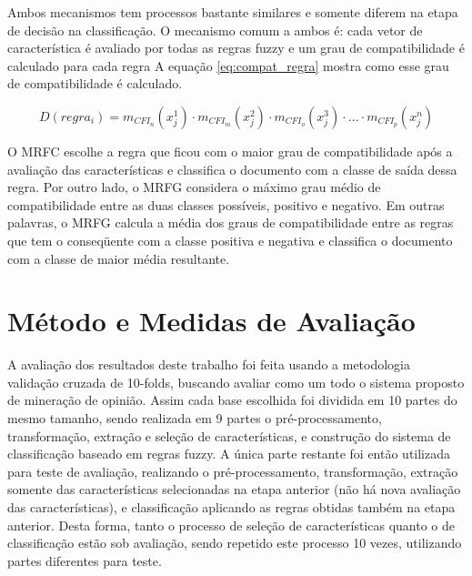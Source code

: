 \documentclass[template.tex]{subfiles}
\begin{document}

Ambos mecanismos tem processos bastante similares e somente diferem na etapa de decisão na classificação. O mecanismo comum a ambos é: cada vetor de característica é avaliado por todas as regras fuzzy e um grau de compatibilidade é calculado para cada regra A equação \ref{eq:compat_regra} mostra como esse grau de compatibilidade é calculado. 


\begin{equation}
D(regra_i) = m_{CFI_n}(x_j^1) \cdot m_{CFI_m}(x_j^2) \cdot m_{CFI_o}(x_j^3) \cdot ...\cdot m_{CFI_p}(x_j^n)
\label{eq:compat_regra}
\end{equation}

O MRFC escolhe a regra que ficou com o maior grau de compatibilidade após a avaliação das características e classifica o documento com a classe de saída dessa regra.  Por outro lado, o MRFG considera o máximo grau médio de compatibilidade entre as duas classes possíveis, positivo e negativo. Em outras palavras, o MRFG calcula a média dos graus de compatibilidade entre as regras que tem o conseqüente com a classe positiva e negativa e classifica o documento com a classe de maior média resultante. 

\section{Método e Medidas de Avaliação}

A avaliação dos resultados deste trabalho foi feita usando a metodologia validação cruzada de 10-folds, buscando avaliar como um todo o sistema proposto de mineração de opinião. Assim cada base escolhida foi dividida em 10 partes do mesmo tamanho, sendo realizada em 9 partes o pré-processamento, transformação, extração e seleção de características, e construção do sistema de classificação baseado em regras fuzzy. A única parte restante foi então utilizada para teste de avaliação, realizando o pré-processamento, transformação,  extração somente das características selecionadas na etapa anterior (não há nova avaliação das características), e classificação aplicando as regras obtidas também na etapa anterior. Desta forma, tanto o processo de seleção de características quanto o de classificação estão sob avaliação, sendo repetido este processo 10 vezes, utilizando partes diferentes para teste.
\end{document}
